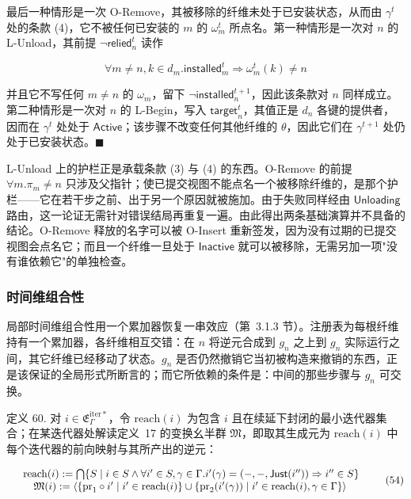\documentclass[
  10
]{article}
\begin{document}
最后一种情形是一次 O-Remove，其被移除的纤维未处于已安装状态，从而由 $\gamma ^ { t }$ 处的条款 (4)，它不被任何已安装的 $m$ 的 $\omega _ { m } ^ { t }$ 所点名。第一种情形是一次对 $n$ 的 L-Unload，其前提 $\neg \mathsf { r e l i e d } _ { n } ^ { t }$ 读作

\[
\forall m \neq n , k \in d _ { m } . \mathsf { i n s t a l l e d } _ { m } ^ { t } \Rightarrow \omega _ { m } ^ { t } ( k ) \neq n
\]

并且它不写任何 $m \neq n$ 的 $\omega _ { m }$，留下 $\neg \mathsf { i n s t a l l e d } _ { n } ^ { t + 1 }$，因此该条款对 $n$ 同样成立。第二种情形是一次对 $n$ 的 L-Begin，写入 $\mathsf { t a r g e t } _ { n } ^ { t }$，其值正是 $d _ { n }$ 各键的提供者，因而在 $\gamma ^ { t }$ 处处于 $\mathsf{Active}$；该步骤不改变任何其他纤维的 $\theta$，因此它们在 $\gamma ^ { t + 1 }$ 处仍处于已安装状态。$\blacksquare$

L-Unload 上的护栏正是承载条款 (3) 与 (4) 的东西。O-Remove 的前提 $\forall m. \pi _ { m } \neq n$ 只涉及父指针；使已提交视图不能点名一个被移除纤维的，是那个护栏——它在若干步之前、出于另一个原因就被施加。由于失败同样经由 $\mathsf{Unloading}$ 路由，这一论证无需针对错误结局再重复一遍。由此得出两条基础演算并不具备的结论。O-Remove 释放的名字可以被 O-Insert 重新签发，因为没有过期的已提交视图会点名它；而且一个纤维一旦处于 $\mathsf{Inactive}$ 就可以被移除，无需另加一项"没有谁依赖它"的单独检查。
\subsubsection{时间维组合性} \label{temporal-composability}

局部时间维组合性用一个累加器恢复一串效应（第~3.1.3 节）。注册表为每根纤维持有一个累加器，各纤维相互交错：在 \(n\) 将逆元合成到 \(g _ { n }\) 之上到 \(g _ { n }\) 实际运行之间，其它纤维已经移动了状态。\(g _ { n }\) 是否仍然撤销它当初被构造来撤销的东西，正是该保证的全局形式所断言的；而它所依赖的条件是：中间的那些步骤与 \(g _ { n }\) 可交换。

定义 60. 对 \(i \in { \mathfrak { E } } _ { \Gamma } ^ { \mathrm { i t e r * } }\)，令 \(\mathrm { r e a c h } ( i )\) 为包含 \(i\) 且在续延下封闭的最小迭代器集合；在某迭代器处解读定义~17 的变换幺半群 \(\mathfrak { M }\)，即取其生成元为 \(\mathrm { r e a c h } ( i )\) 中每个迭代器的前向映射与其所产出的逆元：

\[
\begin{array} { r l } & { \mathrm { r e a c h } ( i ) : = \bigcap \{ S \mid i \in S \land \forall i ^ { \prime } \in S , \gamma \in \Gamma . i ^ { \prime } ( \gamma ) = ( - , - , \mathsf { J u s t } ( i ^ { \prime \prime } ) ) \Rightarrow i ^ { \prime \prime } \in S \} } \\ & { \quad \mathfrak { M } ( i ) : = \langle \{ \mathrm { p r } _ { 1 } \circ i ^ { \prime } \mid i ^ { \prime } \in \mathrm { r e a c h } ( i ) \} \cup \{ \mathrm { p r } _ { 2 } ( i ^ { \prime } ( \gamma ) ) \mid i ^ { \prime } \in \mathrm { r e a c h } ( i ) , \gamma \in \Gamma \} \rangle } \end{array}\tag{54}
\]
\end{document}
